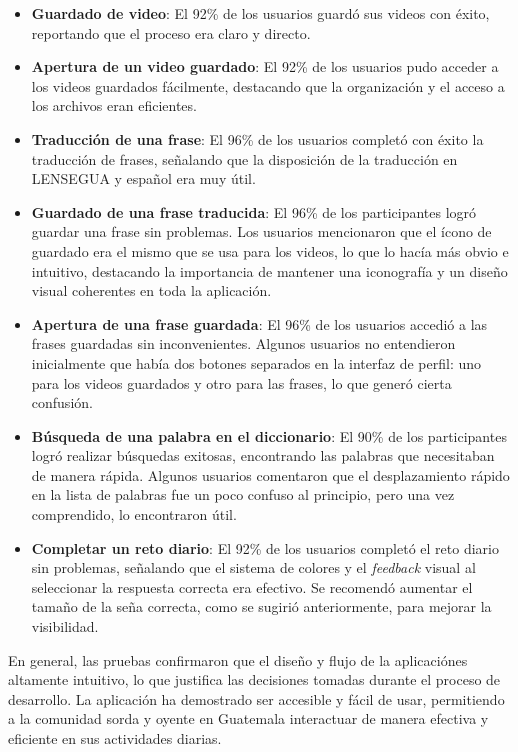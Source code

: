 \begin{itemize}
    
    \item \textbf{Guardado de video}: El 92\% de los usuarios guardó sus videos con éxito, reportando que el proceso era claro y directo.
    \item \textbf{Apertura de un video guardado}: El 92\% de los usuarios pudo acceder a los videos guardados fácilmente, destacando que la organización y el acceso a los archivos eran eficientes.
    \item \textbf{Traducción de una frase}: El 96\% de los usuarios completó con éxito la traducción de frases, señalando que la disposición de la traducción en LENSEGUA y español era muy útil.
    \item \textbf{Guardado de una frase traducida}: El 96\% de los participantes logró guardar una frase sin problemas. Los usuarios mencionaron que el ícono de guardado era el mismo que se usa para los videos, lo que lo hacía más obvio e intuitivo, destacando la importancia de mantener una iconografía y un diseño visual coherentes en toda la aplicación.
    \item \textbf{Apertura de una frase guardada}: El 96\% de los usuarios accedió a las frases guardadas sin inconvenientes. Algunos usuarios no entendieron inicialmente que había dos botones separados en la interfaz de perfil: uno para los videos guardados y otro para las frases, lo que generó cierta confusión.
    \item \textbf{Búsqueda de una palabra en el diccionario}: El 90\% de los participantes logró realizar búsquedas exitosas, encontrando las palabras que necesitaban de manera rápida. Algunos usuarios comentaron que el desplazamiento rápido en la lista de palabras fue un poco confuso al principio, pero una vez comprendido, lo encontraron útil.
    \item \textbf{Completar un reto diario}: El 92\% de los usuarios completó el reto diario sin problemas, señalando que el sistema de colores y el \textit{feedback} visual al seleccionar la respuesta correcta era efectivo. Se recomendó aumentar el tamaño de la seña correcta, como se sugirió anteriormente, para mejorar la visibilidad.
\end{itemize}


En general, las pruebas confirmaron que el diseño y flujo de la aplicaciónes altamente intuitivo, lo que justifica las decisiones tomadas durante el proceso de desarrollo. La aplicación ha demostrado ser accesible y fácil de usar, permitiendo a la comunidad sorda y oyente en Guatemala interactuar de manera efectiva y eficiente en sus actividades diarias.